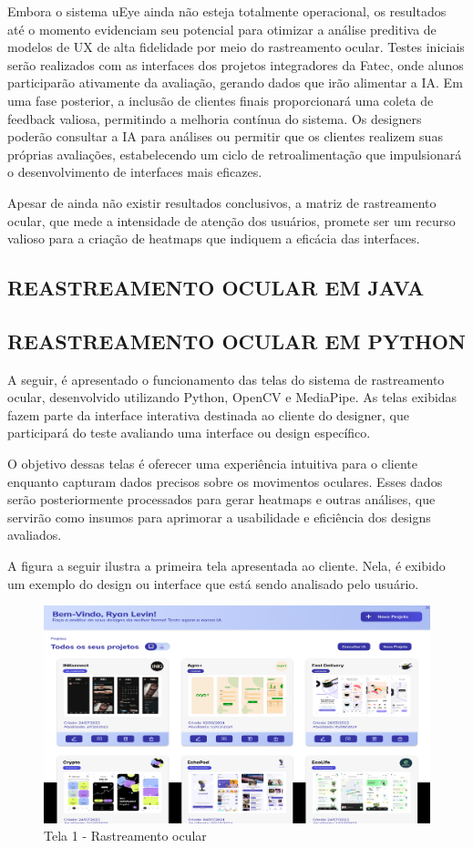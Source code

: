 Embora o sistema uEye ainda não esteja totalmente operacional, os resultados até o momento evidenciam seu potencial para otimizar a análise preditiva de modelos de UX de alta fidelidade por meio do rastreamento ocular. Testes iniciais serão realizados com as interfaces dos projetos integradores da Fatec, onde alunos participarão ativamente da avaliação, gerando dados que irão alimentar a IA. Em uma fase posterior, a inclusão de clientes finais proporcionará uma coleta de feedback valiosa, permitindo a melhoria contínua do sistema. Os designers poderão consultar a IA para análises ou permitir que os clientes realizem suas próprias avaliações, estabelecendo um ciclo de retroalimentação que impulsionará o desenvolvimento de interfaces mais eficazes.

Apesar de ainda não existir resultados conclusivos, a matriz de rastreamento ocular, que mede a intensidade de atenção dos usuários, promete ser um recurso valioso para a criação de heatmaps que indiquem a eficácia das interfaces.\newline

\subsection*{REASTREAMENTO OCULAR EM JAVA}

\subsection*{REASTREAMENTO OCULAR EM PYTHON}
A seguir, é apresentado o funcionamento das telas do sistema de rastreamento ocular, desenvolvido utilizando Python, OpenCV e MediaPipe. As telas exibidas fazem parte da interface interativa destinada ao cliente do designer, que participará do teste avaliando uma interface ou design específico.

O objetivo dessas telas é oferecer uma experiência intuitiva para o cliente enquanto capturam dados precisos sobre os movimentos oculares. Esses dados serão posteriormente processados para gerar heatmaps e outras análises, que servirão como insumos para aprimorar a usabilidade e eficiência dos designs avaliados.

A figura a seguir ilustra a primeira tela apresentada ao cliente. Nela, é exibido um exemplo do design ou interface que está sendo analisado pelo usuário.

\begin{figure}[H]
    \centering
    \caption{Tela 1 - Rastreamento ocular}%
    \label{fig:pg-telaPython1}
    \includegraphics[width=0.72\linewidth]{Illustrations/python1.png}
\end{figure}

